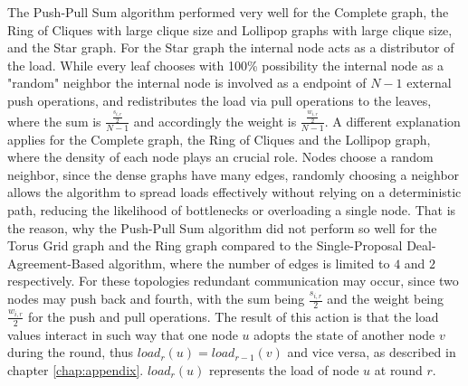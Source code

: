 The Push-Pull Sum algorithm performed very well for the Complete graph, the Ring of Cliques with large clique size and Lollipop graphs with large clique size, and the Star graph. For the Star graph the internal node acts as a distributor of the load. While every leaf chooses with 100\% possibility the internal node as a "random" neighbor the internal node is involved as a endpoint of $N-1$ external push operations, and redistributes the load via pull operations to the leaves, where the sum is $\frac{\frac{s_{i,r}}{2}}{N-1}$ and accordingly the weight is $\frac{\frac{w_{i,r}}{2}}{N-1}$. A different explanation applies for the Complete graph, the Ring of Cliques and the Lollipop graph, where the density of each node plays an crucial role. Nodes choose a random neighbor, since the dense graphs have many edges, randomly choosing a neighbor allows the algorithm to spread loads effectively without relying on a deterministic path, reducing the likelihood of bottlenecks or overloading a single node. That is the reason, why the Push-Pull Sum algorithm did not perform so well for the Torus Grid graph and the Ring graph compared to the Single-Proposal Deal-Agreement-Based algorithm, where the number of edges is limited to $4$ and $2$ respectively. For these topologies redundant communication may occur, since two nodes may push back and fourth, with the sum being $\frac{s_{i,r}}{2}$ and the weight being $\frac{w_{i,r}}{2}$ for the push and pull operations. The result of this action is that the load values interact in such way that one node $u$ adopts the state of another node $v$ during the round, thus $load_{r}(u)=load_{r-1}(v)$ and vice versa, as described in chapter \ref{chap:appendix}. $load_{r}(u)$ represents the load of node $u$ at round $r$.
